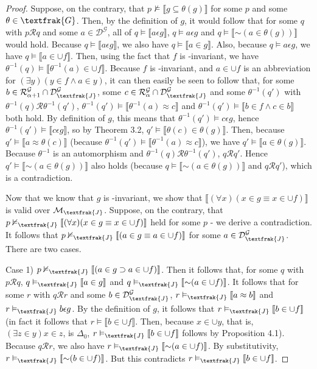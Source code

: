 \documentclass{article}
\newcommand*{\oldneg}{\mathord{\sim}}
\newcommand{\lbc}{\llbracket}
\newcommand{\rbc}{\rrbracket}
\theoremstyle{definition}
\begin{document}
\begin{proof}
Suppose, on the contrary, that $p\nvDash\lbc g\subseteq\theta(g)\rbc$ for some $p$ and some $\theta\in\textfrak{G}$. Then, by the definition of $g$, 
it would follow that for some $q$ with $p\mathcal{R}q$ and some $a\in\mathcal{D}^\mathcal{G}$,
all of $q\vDash\lbc a\epsilon g\rbc$, $q\vDash a\epsilon g$ and $q\vDash\lbc\oldneg(a\in\theta(g))\rbc$ would hold. Because 
$q\vDash\lbc a\epsilon g\rbc$, we also have $q\vDash\lbc a\in g\rbc$. Also, because $q\vDash a\epsilon g$, we have 
$q\vDash\lbc a\in\cup f\rbc$. Then, using the fact that $f$ is 
-invariant, we have
$\theta^{-1}(q)\vDash\lbc\theta^{-1}(a)\in\cup f\rbc$. Because $f$ is -invariant, and $a\in\cup f$ is an abbreviation for
$(\exists y)(y\in f\wedge a\in y)$, it can then easily be seen to follow that, for
some $b\in\mathcal{R}^\mathcal{G}_{\alpha+1}\cap\mathcal{D}^\mathcal{G}_\textfrak{J}$, some 
$c\in\mathcal{R}^\mathcal{G}_\alpha\cap\mathcal{D}^\mathcal{G}_\textfrak{J}$ and some $\theta^{-1}(q')$ with 
$\theta^{-1}(q)\mathcal{R}\theta^{-1}(q')$, $\theta^{-1}(q')\vDash\lbc\theta^{-1}(a)\approx c\rbc$ and
$\theta^{-1}(q')\vDash\lbc b\in f\wedge c\in b\rbc$ both hold. By definition of $g$, this means that 
$\theta^{-1}(q')\vDash c\epsilon g$, hence $\theta^{-1}(q')\vDash\lbc c\epsilon g\rbc$, so by Theorem 3.2, 
$q'\vDash\lbc\theta(c)\in\theta(g)\rbc$. 
Then, because $q'\vDash\lbc a\approx\theta(c)\rbc$
(because $\theta^{-1}(q')\vDash\lbc\theta^{-1}(a)\approx c\rbc$), we have $q'\vDash\lbc a\in\theta(g)\rbc$. 
Because $\theta^{-1}$ is an automorphism and $\theta^{-1}(q)\mathcal{R}\theta^{-1}(q')$, $q\mathcal{R}q'$. Hence
$q'\vDash\lbc\oldneg(a\in\theta(g))\rbc$ also holds (because $q\vDash\lbc\oldneg(a\in\theta(g))\rbc$ and $q\mathcal{R}q'$), which is a contradiction.

Now that we know that $g$ is -invariant, we show that $\lbc(\forall x)(x\in g\equiv x\in\cup f)\rbc$ is 
valid over $\mathcal{M}_\textfrak{J}$. Suppose, on the contrary, that 
$p\nvDash_\textfrak{J}\lbc(\forall x)(x\in g\equiv x\in\cup f)\rbc$ held for some $p$ - we derive a contradiction. It follows that
$p\nvDash_\textfrak{J}\lbc(a\in g\equiv a\in \cup f)\rbc$ for some $a\in\mathcal{D}^\mathcal{G}_\textfrak{J}$. There are 
two cases.

Case 1) $p\nvDash_\textfrak{J}\lbc (a\in g\supset a\in \cup f)\rbc$. Then it follows that, for some 
$q$ with $p\mathcal{R}q$, $q\vDash_\textfrak{J}\lbc a\in g\rbc$ and $q\vDash_\textfrak{J}\lbc\oldneg(a\in\cup f)\rbc$. It follows that for some 
$r$ with $q\mathcal{R}r$ and some $b\in\mathcal{D}^\mathcal{G}_\textfrak{J}$, $r\vDash_\textfrak{J}\lbc a\approx b\rbc$ and 
$r\vDash_\textfrak{J} b\epsilon g$. By the definition of $g$, it follows that 
$r\vDash_\textfrak{J}\lbc b\in\cup f\rbc$ (in fact it follows that 
$r\vDash\lbc b\in\cup f\rbc$. Then, because $x\in\cup y$, that is, 
$(\exists z\in y)x\in z$, is $\Delta_0$, $r\vDash_\textfrak{J}\lbc b\in\cup f\rbc$ follows by Proposition 4.1). 
Because $q\mathcal{R}r$, we also have
$r\vDash_\textfrak{J}\lbc\oldneg(a\in \cup f)\rbc$. By substitutivity, 
$r\vDash_\textfrak{J}\lbc\oldneg(b\in \cup f)\rbc$. But this contradicts $r\vDash_\textfrak{J}\lbc b\in\cup f\rbc$.


\end{proof}
\end{document}
